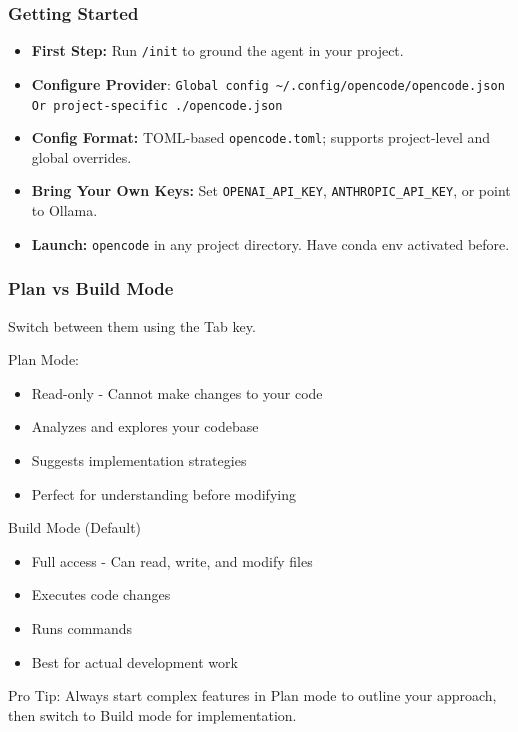 \begin{frame}[fragile]\frametitle{ Getting Started}
  \begin{itemize}
    \item \textbf{First Step:} Run \texttt{/init} to ground the agent in your project.
	\item \textbf{Configure Provider}:  \lstinline|Global config ~/.config/opencode/opencode.json Or project-specific ./opencode.json|
    \item \textbf{Config Format:} TOML-based \texttt{opencode.toml}; supports project-level and global overrides.

    \item \textbf{Bring Your Own Keys:} Set \texttt{OPENAI\_API\_KEY}, \texttt{ANTHROPIC\_API\_KEY}, or point to Ollama.
    \item \textbf{Launch:} \texttt{opencode} in any project directory. Have conda env activated before.
  \end{itemize}
\end{frame}

\begin{frame}[fragile]\frametitle{Plan vs Build Mode}

Switch between them using the Tab key.

Plan Mode:
  \begin{itemize}
    \item Read-only - Cannot make changes to your code
    \item Analyzes and explores your codebase
    \item Suggests implementation strategies
    \item Perfect for understanding before modifying
  \end{itemize}
  
Build Mode (Default)
  \begin{itemize}
    \item Full access - Can read, write, and modify files
    \item Executes code changes
    \item Runs commands
    \item Best for actual development work
  \end{itemize}  
  
Pro Tip: Always start complex features in Plan mode to outline your approach, then switch to Build mode for implementation.  
\end{frame}

